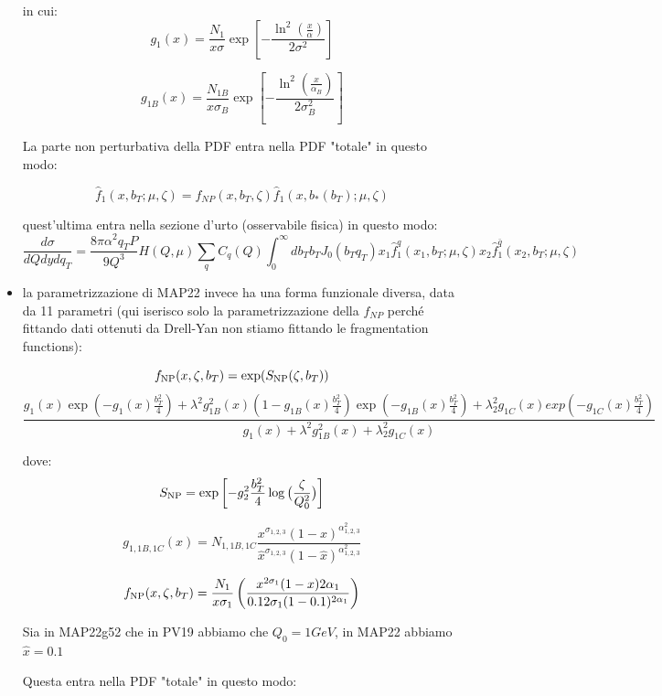 \documentclass{article}
\begin{document}
\begin{itemize}
    in cui: 
    \[
    g_1(x) = \frac{N_1}{x\sigma} \exp \left[ - \frac{\ln^2\left(\frac{x}{\alpha}\right)}{2 \sigma^2} \right]
    \]
    
    \[
    g_{1B}(x) = \frac{N_{1B}}{x\sigma_B} \exp\left[ - \frac{\ln^2\left(\frac{x}{\alpha_B}\right)}{2 \sigma_B^2} \right]
    \]

    La parte non perturbativa della PDF entra nella PDF "totale" in questo modo:

    \[
    \hat{f}_1(x, b_T; \mu, \zeta) = f_{NP}(x, b_T, \zeta) \hat{f}_1(x, b_*(b_T); \mu, \zeta)
    \]

    quest'ultima entra nella sezione d'urto (osservabile fisica) in questo modo:
    \[
    \frac{d \sigma}{dQ dy dq_T } = \frac{8\pi \alpha^2 q_T P}{9 Q^3} H(Q, \mu) \sum_q C_q(Q) \int_{0}^{\infty}db_T b_T J_0(b_Tq_T)x_1\hat{f}_1^q(x_1, b_T; \mu, \zeta) x_2\hat{f}_1^{\bar{q}}(x_2, b_T; \mu, \zeta)
    \]
    
    \item la parametrizzazione di MAP22 invece ha una forma funzionale diversa, data da 11 parametri (qui iserisco solo la parametrizzazione della $f_{NP}$ perché fittando dati ottenuti da Drell-Yan non stiamo fittando le fragmentation functions):
    
    \[
    f_{\rm NP}(x,\zeta, b_T)= \exp(S_{\rm NP}(\zeta, b_T))
    \]
    \[
    \frac{g_1(x) \exp( - g_1(x) \frac{b_T^2}{4}) + \lambda^2 g_{1B}^2(x) ( 1 - g_{1B}(x) \frac{b_T^2}{4}) \exp( - g_{1B}(x) \frac{b_T^2}{4}) + \lambda_2^2 g_{1C}(x) exp( - g_{1C}(x) \frac{b_T^2}{4}) }{  g_1(x) +  \lambda^2 g_{1B}^2(x) + \lambda_2^2 g_{1C}(x)}
    \]

    dove:
    \[
    S_{\rm NP} = \exp\left[ - g_2^2 \frac{b_T^2}{4} \log \big (\frac{\zeta}{Q_0^2}\big ) \right]
    \]

    \[
    g_{1,1B,1C}(x) = N_{1,1B,1C} \frac{x^{\sigma_{1,2,3}}(1-x)^{\alpha^2_{1,2,3}}}{\hat{x}^{\sigma_{1,2,3}}(1-\hat{x})^{\alpha^2_{1,2,3}}}
    \]

    \[ f_{\rm NP}(x, \zeta, b_T) = \frac{N_1}{x\sigma_1} \left(\frac{x^{2\sigma_1} (1 - x){2\alpha_1}}{0.1{2\sigma_1} (1 - 0.1)^{2\alpha_1}}\right) \]

   

    Sia in MAP22g52 che in PV19 abbiamo che $Q_0 = 1 GeV$, in MAP22 abbiamo $\hat{x} = 0.1 $

    Questa entra nella PDF "totale" in questo modo:
    
\end{itemize}
  
\end{document}
